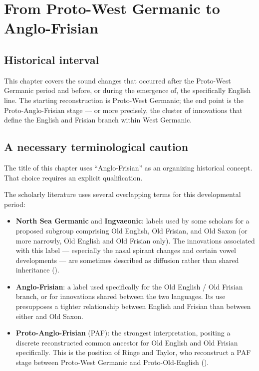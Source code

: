 \documentclass[
  british,
  a4paper,
  openany]{book}
\providecommand{\tightlist}{%
  \setlength{\itemsep}{0pt}\setlength{\parskip}{0pt}}
\begin{document}
\newpage

\chapter{From Proto-West Germanic to
Anglo-Frisian}\label{from-proto-west-germanic-to-anglo-frisian}

\section{Historical interval}\label{historical-interval-2}

This chapter covers the sound changes that occurred after the Proto-West
Germanic period and before, or during the emergence of, the specifically
English line. The starting reconstruction is Proto-West Germanic; the
end point is the Proto-Anglo-Frisian stage --- or more precisely, the
cluster of innovations that define the English and Frisian branch within
West Germanic.

\section{A necessary terminological
caution}\label{a-necessary-terminological-caution}

The title of this chapter uses ``Anglo-Frisian'' as an organizing
historical concept. That choice requires an explicit qualification.

The scholarly literature uses several overlapping terms for this
developmental period:

\begin{itemize}
\tightlist
\item
  \textbf{North Sea Germanic} and \textbf{Ingvaeonic}: labels used by
  some scholars for a proposed subgroup comprising Old English, Old
  Frisian, and Old Saxon (or more narrowly, Old English and Old Frisian
  only). The innovations associated with this label --- especially the
  nasal spirant changes and certain vowel developments --- are sometimes
  described as diffusion rather than shared inheritance
  ().
\item
  \textbf{Anglo-Frisian}: a label used specifically for the Old English
  / Old Frisian branch, or for innovations shared between the two
  languages. Its use presupposes a tighter relationship between English
  and Frisian than between either and Old Saxon.
\item
  \textbf{Proto-Anglo-Frisian} (PAF): the strongest interpretation,
  positing a discrete reconstructed common ancestor for Old English and
  Old Frisian specifically. This is the position of Ringe and Taylor,
  who reconstruct a PAF stage between Proto-West Germanic and
  Proto-Old-English ().
\end{itemize}
\end{document}
